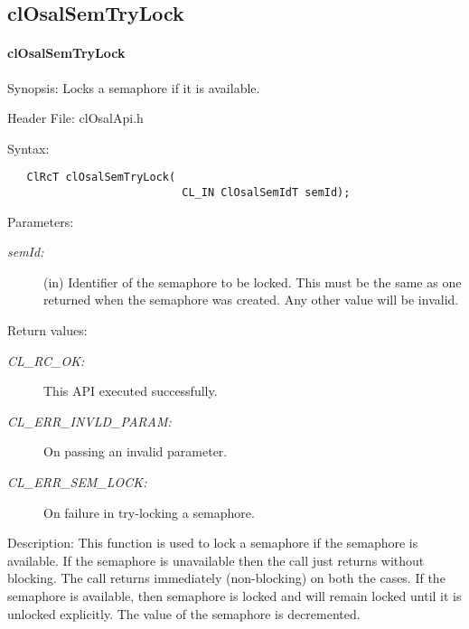 \subsection{clOsalSemTryLock}
\hypertarget{pageosal135}{}\paragraph{cl\-Osal\-Sem\-Try\-Lock}\label{pageosal135}
\begin{Desc}
\item[Synopsis:]Locks a semaphore if it is available.\end{Desc}
\begin{Desc}
\item[Header File:]clOsalApi.h\end{Desc}
\begin{Desc}
\item[Syntax:]

\footnotesize\begin{verbatim}   ClRcT clOsalSemTryLock(
                           CL_IN ClOsalSemIdT semId);
\end{verbatim}
\normalsize
\end{Desc}
\begin{Desc}
\item[Parameters:]
\begin{description}
\item[{\em sem\-Id:}](in) Identifier of the semaphore to be locked. This must be the same as one returned when the semaphore was created. Any other value will be invalid.\end{description}
\end{Desc}
\begin{Desc}
\item[Return values:]
\begin{description}
\item[{\em CL\_\-RC\_\-OK:}]This API executed successfully. \item[{\em CL\_\-ERR\_\-INVLD\_\-PARAM:}]On passing an invalid parameter. \item[{\em CL\_\-ERR\_\-SEM\_\-LOCK:}]On failure in try-locking a semaphore.\end{description}
\end{Desc}
\begin{Desc}
\item[Description:]This function is used to lock a semaphore if the semaphore is available. If the semaphore is unavailable then the call just returns without blocking. The call returns immediately (non-blocking) on both the cases. If the semaphore is available, then semaphore is locked and will remain locked until it is unlocked explicitly. The value of the semaphore is decremented.\end{Desc}
